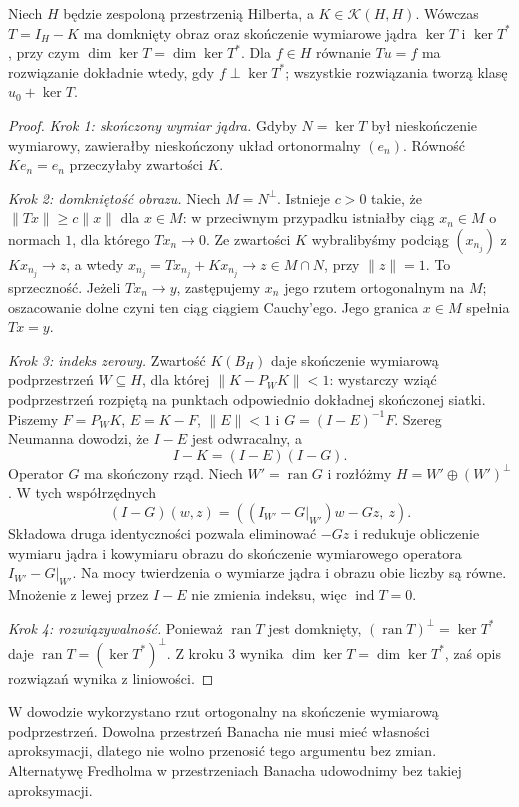 \begin{twierdzenie}
\label{thm:fredholm-hilbert30}
Niech $H$ będzie zespoloną przestrzenią Hilberta, a
$K\in\mathcal K(H,H)$. Wówczas $T=I_H-K$ ma domknięty
obraz oraz skończenie wymiarowe jądra $\ker T$ i $\ker T^*$,
przy czym $\dim\ker T=\dim\ker T^*$.
Dla $f\in H$ równanie $Tu=f$ ma rozwiązanie dokładnie wtedy,
gdy $f\perp\ker T^*$; wszystkie rozwiązania tworzą
klasę $u_0+\ker T$.
\end{twierdzenie}
\begin{proof}
\emph{Krok 1: skończony wymiar jądra.}
Gdyby $N=\ker T$ był nieskończenie wymiarowy, zawierałby
nieskończony układ ortonormalny $(e_n)$. Równość $Ke_n=e_n$
przeczyłaby zwartości $K$.

\emph{Krok 2: domkniętość obrazu.}
Niech $M=N^\perp$. Istnieje $c>0$ takie, że
$\|Tx\|\ge c\|x\|$ dla $x\in M$: w przeciwnym przypadku
istniałby ciąg $x_n\in M$ o normach $1$, dla którego
$Tx_n\to0$. Ze zwartości $K$ wybralibyśmy podciąg
$(x_{n_j})$ z $Kx_{n_j}\to z$, a wtedy
$x_{n_j}=Tx_{n_j}+Kx_{n_j}\to z\in M\cap N$, przy $\|z\|=1$.
To sprzeczność. Jeżeli $Tx_n\to y$, zastępujemy $x_n$
jego rzutem ortogonalnym na $M$; oszacowanie dolne
czyni ten ciąg ciągiem Cauchy'ego. Jego granica $x\in M$
spełnia $Tx=y$.

\emph{Krok 3: indeks zerowy.}
Zwartość $K(B_H)$ daje skończenie wymiarową podprzestrzeń
$W\subseteq H$, dla której
$\|K-P_WK\|<1$: wystarczy wziąć podprzestrzeń
rozpiętą na punktach odpowiednio dokładnej skończonej siatki.
Piszemy $F=P_WK$, $E=K-F$, $\|E\|<1$ i
$G=(I-E)^{-1}F$. Szereg Neumanna dowodzi, że $I-E$
jest odwracalny, a
\[I-K=(I-E)(I-G).\]
Operator $G$ ma skończony rząd. Niech $W'=\operatorname{ran}G$
i rozłóżmy $H=W'\oplus(W')^\perp$.
W tych współrzędnych
\[(I-G)(w,z)=((I_{W'}-G|_{W'})w-Gz,\ z).\]
Składowa druga identyczności pozwala eliminować $-Gz$
i redukuje obliczenie wymiaru jądra i kowymiaru obrazu
do skończenie wymiarowego operatora $I_{W'}-G|_{W'}$.
Na mocy twierdzenia o wymiarze jądra i obrazu obie liczby są
równe. Mnożenie z lewej przez $I-E$ nie zmienia
indeksu, więc $\operatorname{ind}T=0$.

\emph{Krok 4: rozwiązywalność.}
Ponieważ $\operatorname{ran}T$ jest domknięty,
$(\operatorname{ran}T)^\perp=\ker T^*$ daje
$\operatorname{ran}T=(\ker T^*)^\perp$. Z kroku 3 wynika
$\dim\ker T=\dim\ker T^*$, zaś opis rozwiązań
wynika z liniowości.
\end{proof}

\begin{uwaga}
\label{rem:fredholm-hilbert-scope30}
W dowodzie wykorzystano rzut ortogonalny na skończenie
wymiarową podprzestrzeń. Dowolna przestrzeń Banacha
nie musi mieć własności aproksymacji, dlatego nie wolno
przenosić tego argumentu bez zmian. Alternatywę Fredholma
w przestrzeniach Banacha udowodnimy bez takiej aproksymacji.
\end{uwaga}

